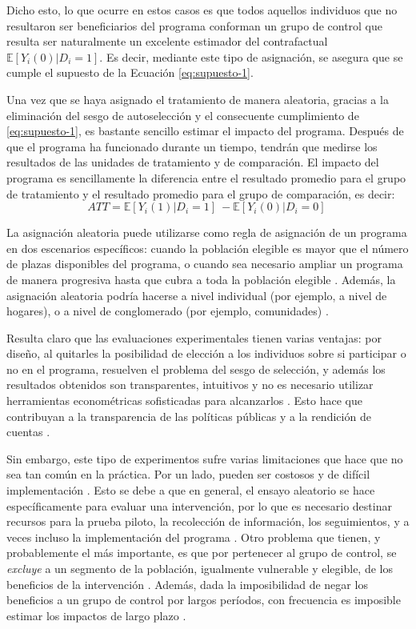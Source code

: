 \documentclass[../../main.tex]{subfiles}
\begin{document}
Dicho esto, lo que ocurre en estos casos es que todos aquellos individuos que no
resultaron ser beneficiarios del programa conforman un grupo de control que resulta ser
naturalmente un excelente estimador del contrafactual \(\mathbb{E}
\left[Y_i(0)|D_i=1\right]\). Es decir, mediante este tipo de asignación, se asegura que se
cumple el supuesto de la Ecuación \ref{eq:supuesto-1}.

Una vez que se haya asignado el tratamiento de manera aleatoria, gracias a la eliminación
del sesgo de autoselección y el consecuente cumplimiento de \ref{eq:supuesto-1}, es
bastante sencillo estimar el impacto del programa. Después de que el programa ha
funcionado durante un tiempo, tendrán que medirse los resultados de las unidades de
tratamiento y de comparación. El impacto del programa es sencillamente la diferencia entre
el resultado promedio para el grupo de tratamiento y el resultado promedio para el grupo
de comparación, es decir:
\[
    ATT = \mathbb{E} \left[Y_i(1)|D_i=1\right]\ - \mathbb{E} \left[Y_i(0)|D_i=0\right]\
\]

La asignación aleatoria puede utilizarse como regla de asignación de un programa en dos
escenarios específicos: cuando la población elegible es mayor que el número de plazas
disponibles del programa, o  cuando sea necesario ampliar un programa de manera progresiva
hasta que cubra a toda la población elegible \cite{gertler-2016}. Además, la asignación
aleatoria podría hacerse a nivel individual (por ejemplo, a nivel de hogares), o a nivel
de conglomerado (por ejemplo, comunidades) \cite{bernal}.

Resulta claro que las evaluaciones experimentales tienen varias ventajas: por diseño, al
quitarles la posibilidad de elección a los individuos sobre si participar o no en el
programa, resuelven el problema del sesgo de selección, y además los resultados obtenidos
son transparentes, intuitivos y no es necesario utilizar herramientas econométricas
sofisticadas para alcanzarlos \cite{bernal}. Esto hace que contribuyan a la transparencia
de las políticas públicas y a la rendición de cuentas \cite{bernal}.

Sin embargo, este tipo de experimentos sufre varias limitaciones que hace que no sea tan
común en la práctica. Por un lado, pueden ser costosos y de difícil implementación
\cite{bernal}. Esto se debe a que en general, el ensayo aleatorio se hace específicamente
para evaluar una intervención, por lo que es necesario destinar recursos para la prueba
piloto, la recolección de información, los seguimientos, y a veces incluso la
implementación del programa \cite{bernal}. Otro problema que tienen, y probablemente el
más importante, es que por pertenecer al grupo de control, se \textit{excluye} a un
segmento de la población, igualmente vulnerable y elegible, de los beneficios de la
intervención \cite{bernal}. Además, dada la imposibilidad de negar los beneficios a un
grupo de control por largos períodos, con frecuencia es imposible estimar los impactos de
largo plazo \cite{bernal}.
\end{document}
